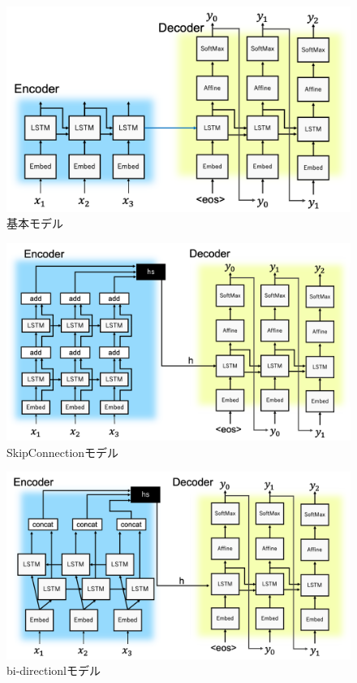 \documentclass[a4j,11pt,report]{jsbook}
\begin{document}
\begin{center}
  \begin{figure}[H]
    \centering
    \includegraphics[width=0.9\linewidth]{image/seq2seq_image.png}
    \caption{基本モデル}
    \label{fig:seq2seq}
  \end{figure}
\end{center}

\begin{center}
  \begin{figure}[H]
    \centering
    \includegraphics[width=0.9\linewidth]{image/Skipconnect.png}
    \caption{SkipConnectionモデル}
    \label{fig:SkipSeq2seq}
  \end{figure}
\end{center}

\begin{center}
  \begin{figure}[H]
    \centering
    \includegraphics[width=0.9\linewidth]{image/twinRNN.png}
    \caption{bi-directionlモデル}
    \label{fig:Bi-Directional Seq2seq}
  \end{figure}
\end{center}
\end{document}
